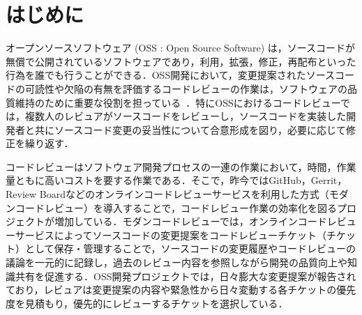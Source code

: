\documentclass[11pt]{jreport}
\begin{document}
\tableofcontents



\newpage
{}	%



\chapter{はじめに}

オープンソースソフトウェア (OSS : Open Source Software) は，ソースコードが無償で公開されているソフトウェアであり，利用，拡張，修正，再配布といった行為を誰でも行うことができる．OSS開発において，変更提案されたソースコードの可読性や欠陥の有無を評価するコードレビューの作業は，ソフトウェアの品質維持のために重要な役割を担っている~\cite{quality1}\cite{quality2}．特にOSSにおけるコードレビューでは，複数人のレビュアがソースコードをレビューし，ソースコードを実装した開発者と共にソースコード変更の妥当性について合意形成を図り，必要に応じて修正を繰り返す．

コードレビューはソフトウェア開発プロセスの一連の作業において，時間，作業量ともに高いコストを要する作業である\cite{cost}．そこで，昨今ではGitHub，Gerrit，Review Boardなどのオンラインコードレビューサービスを利用した方式（モダンコードレビュー\cite{quality1}）を導入することで，コードレビュー作業の効率化を図るプロジェクトが増加している．モダンコードレビューでは，オンラインコードレビューサービスによってソースコードの変更提案をコードレビューチケット（チケット）として保存・管理することで，ソースコードの変更履歴やコードレビューの議論を一元的に記録し，過去のレビュー内容を参照しながら開発の品質向上や知識共有を促進する．OSS開発プロジェクトでは，日々膨大な変更提案が報告されており，レビュアは変更提案の内容や緊急性から日々変動する各チケットの優先度を見積もり，優先的にレビューするチケットを選択している\cite{integrator}．
\end{document}
